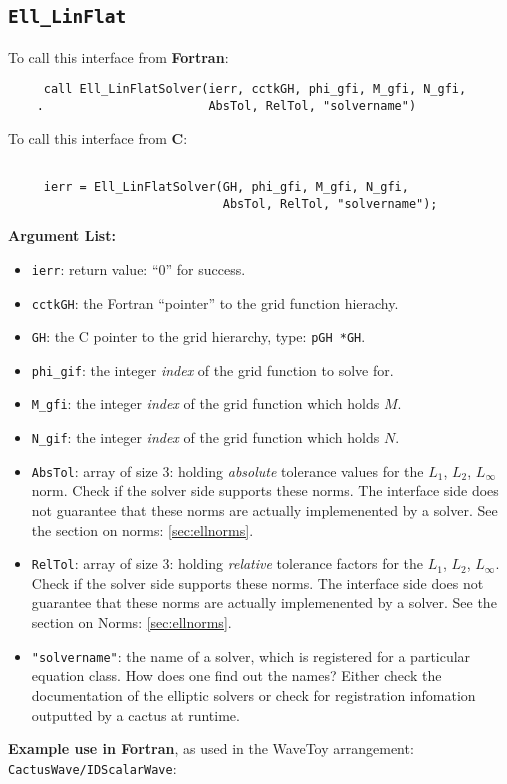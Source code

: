 \documentclass{article}
\begin{document}
\subsection{{\tt Ell\_LinFlat}}
To call this interface from {\bf Fortran}:
\begin{verbatim}
	 call Ell_LinFlatSolver(ierr, cctkGH, phi_gfi, M_gfi, N_gfi,
	.                       AbsTol, RelTol, "solvername") 
\end{verbatim}
To call this interface from {\bf C}:
\begin{verbatim}

	 ierr = Ell_LinFlatSolver(GH, phi_gfi, M_gfi, N_gfi,
	                          AbsTol, RelTol, "solvername"); 
\end{verbatim}
{\bf Argument List:}
\begin{itemize}
\item{\tt ierr}: return value: ``0'' for success.
\item{\tt cctkGH}: the Fortran ``pointer'' to the grid function
hierachy.
\item{\tt GH}: the C pointer to the grid hierarchy, type: {\tt pGH *GH}.
\item{\tt phi\_gif}: the integer {\em index} of the grid function to solve
for.
\item{\tt M\_gfi}:  the integer {\em index} of the grid function which holds
$M$.
\item{\tt N\_gif}: the integer {\em index} of the grid function which holds $N$.
\item{\tt AbsTol}: array of size $3$: holding {\em absolute} tolerance values for the 
$L_1$, $L_2$, $L_\infty$ norm.  Check if the solver side supports
these norms.  The interface side does not guarantee that these norms are 
actually implemenented by a solver. See the section on norms: \ref{sec:ellnorms}.
\item{\tt RelTol}: array of size $3$: holding {\em relative}
tolerance factors for the $L_1$, $L_2$, $L_\infty$. Check if the 
solver side supports these norms. The interface side does not
guarantee that these norms are actually implemenented by a solver. 
See the section on Norms: \ref{sec:ellnorms}.
\item{\tt  "solvername"}: the name of a solver, which is registered
for a particular equation class. How does one find out the names?  Either
check the documentation of the elliptic solvers or check for
registration infomation outputted by a cactus at runtime.
\end{itemize}
{\bf Example use in Fortran}, as used in the WaveToy arrangement: {\tt
CactusWave/IDScalarWave}:
\end{document}
